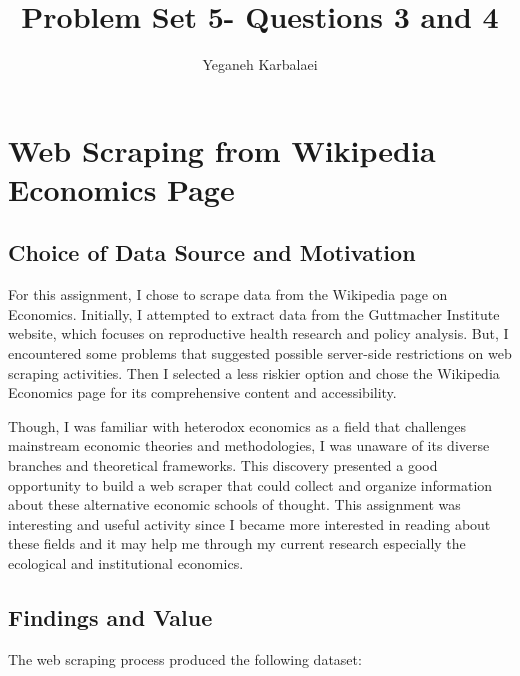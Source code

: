\documentclass{article}
\title{Problem Set 5- Questions 3 and 4}
\author{Yeganeh Karbalaei}
\date{}
\begin{document}
\maketitle

\section{Web Scraping from Wikipedia Economics Page}

\subsection{Choice of Data Source and Motivation}
For this assignment, I chose to scrape data from the Wikipedia page on Economics. Initially, I attempted to extract data from the Guttmacher Institute website, which focuses on reproductive health research and policy analysis. But, I encountered some problems that suggested possible server-side restrictions on web scraping activities. Then I selected a less riskier option and chose the Wikipedia Economics page for its comprehensive content and accessibility.

Though, I was familiar with heterodox economics as a field that challenges mainstream economic theories and methodologies, I was unaware of its diverse branches and theoretical frameworks. This discovery presented a good opportunity to build a web scraper that could collect and organize information about these alternative economic schools of thought. This assignment was interesting and useful activity since I became more interested in reading about these fields and it may help me through my current research especially the ecological and institutional economics.  

\subsection{Findings and Value}
The web scraping process produced the following dataset:
\end{document}

